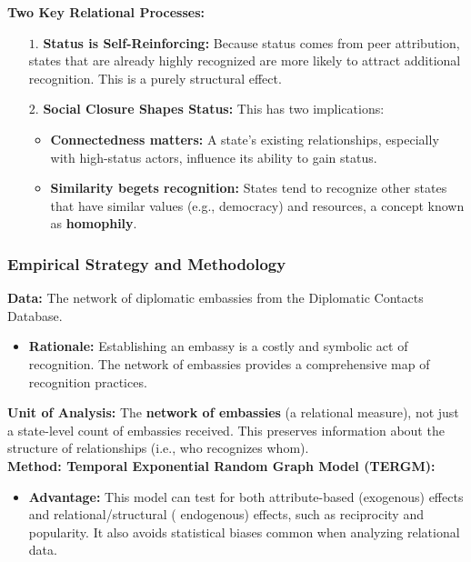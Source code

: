 \documentclass{article}
\begin{document}
    \noindent \textbf{Two Key Relational Processes:}
    \begin{itemize}
        \item [$1$.] \textbf{Status is Self-Reinforcing:} Because status
        comes from peer attribution, states that are already highly
        recognized are more likely to attract additional recognition. This
        is a purely structural effect.
        \item[$2$.] \textbf{Social Closure Shapes Status:} This has two
        implications:
        \begin{itemize}
            \item \textbf{Connectedness matters:} A state's existing
            relationships, especially with high-status actors, influence its
            ability to gain status.
            \item \textbf{Similarity begets recognition:} States tend to
            recognize other states that have similar values (e.g.,
            democracy) and resources, a concept known as \textbf{homophily}.
        \end{itemize}
    \end{itemize}

    \subsubsection{Empirical Strategy and Methodology}

    \noindent \textbf{Data:} The network of diplomatic embassies from the
Diplomatic Contacts Database.
    \begin{itemize}
        \item \textbf{Rationale:} Establishing an embassy is a costly and
        symbolic act of recognition. The network of embassies provides a
        comprehensive map of recognition practices.
    \end{itemize}

    \noindent \textbf{Unit of Analysis:} The
\textbf{network of embassies} (a relational measure), not just a state-level
count of embassies received. This preserves information about the structure
of relationships (i.e., who recognizes whom).\\

    \noindent \textbf{Method: Temporal Exponential Random Graph Model (TERGM):}
    \begin{itemize}
        \item \textbf{Advantage:} This model can test for both
        attribute-based (exogenous) effects and relational/structural (
        endogenous) effects, such as reciprocity and popularity. It also
        avoids statistical biases common when analyzing relational data.
    \end{itemize}
\end{document}
